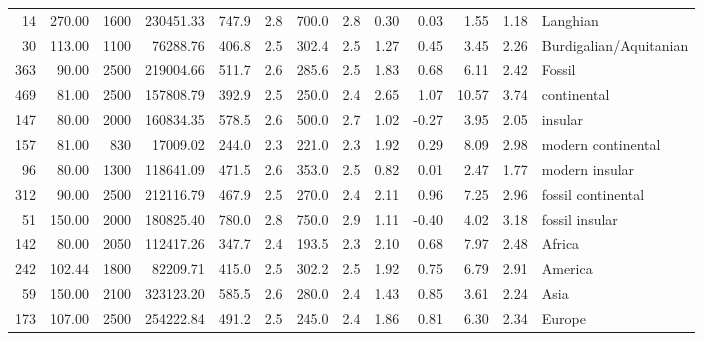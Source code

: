 \begin{landscape}
\begin{longtable}[]{@{}rrrrrrrrrrrrl@{}}
	14 & 270.00 & 1600 & 230451.33 & 747.9 & 2.8 & 700.0 & 2.8 & 0.30 & 0.03
	& 1.55 & 1.18 & Langhian\tabularnewline
	30 & 113.00 & 1100 & 76288.76 & 406.8 & 2.5 & 302.4 & 2.5 & 1.27 & 0.45
	& 3.45 & 2.26 & Burdigalian/Aquitanian\tabularnewline
	363 & 90.00 & 2500 & 219004.66 & 511.7 & 2.6 & 285.6 & 2.5 & 1.83 & 0.68
	& 6.11 & 2.42 & Fossil\tabularnewline
	469 & 81.00 & 2500 & 157808.79 & 392.9 & 2.5 & 250.0 & 2.4 & 2.65 & 1.07
	& 10.57 & 3.74 & continental\tabularnewline
	147 & 80.00 & 2000 & 160834.35 & 578.5 & 2.6 & 500.0 & 2.7 & 1.02 &
	-0.27 & 3.95 & 2.05 & insular\tabularnewline
	157 & 81.00 & 830 & 17009.02 & 244.0 & 2.3 & 221.0 & 2.3 & 1.92 & 0.29 &
	8.09 & 2.98 & modern continental\tabularnewline
	96 & 80.00 & 1300 & 118641.09 & 471.5 & 2.6 & 353.0 & 2.5 & 0.82 & 0.01
	& 2.47 & 1.77 & modern insular\tabularnewline
	312 & 90.00 & 2500 & 212116.79 & 467.9 & 2.5 & 270.0 & 2.4 & 2.11 & 0.96
	& 7.25 & 2.96 & fossil continental\tabularnewline
	51 & 150.00 & 2000 & 180825.40 & 780.0 & 2.8 & 750.0 & 2.9 & 1.11 &
	-0.40 & 4.02 & 3.18 & fossil insular\tabularnewline
	142 & 80.00 & 2050 & 112417.26 & 347.7 & 2.4 & 193.5 & 2.3 & 2.10 & 0.68
	& 7.97 & 2.48 & Africa\tabularnewline
	242 & 102.44 & 1800 & 82209.71 & 415.0 & 2.5 & 302.2 & 2.5 & 1.92 & 0.75
	& 6.79 & 2.91 & America\tabularnewline
	59 & 150.00 & 2100 & 323123.20 & 585.5 & 2.6 & 280.0 & 2.4 & 1.43 & 0.85
	& 3.61 & 2.24 & Asia\tabularnewline
	173 & 107.00 & 2500 & 254222.84 & 491.2 & 2.5 & 245.0 & 2.4 & 1.86 &
	0.81 & 6.30 & 2.34 & Europe\tabularnewline
	\bottomrule
\end{longtable}
\end{landscape}